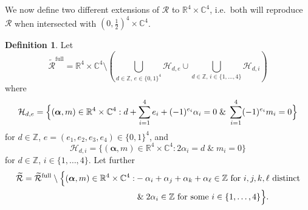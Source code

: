 \documentclass[12pt,letterpaper,reqno]{amsart}
\def\mathbf#1{#1}%
\theoremstyle{remark}
\theoremstyle{definition}
\newtheorem{defn}[thm]{Definition}
\numberwithin{thm}{section}
\numberwithin{equation}{section}
\numberwithin{figure}{section}
\newcommand{\R}{\ensuremath{\mathbb R}}
\newcommand{\C}{\ensuremath{\mathbb C}}
\newcommand{\Z}{\ensuremath{\mathbb Z}}
\begin{document}
\smallskip



 We now define two different extensions of $\mathcal{R}$  to $\R^4 \times \C^4$, i.e.\ both will reproduce $\mathcal{R}$ when intersected with $(0, \frac{1}{2})^4 \times \C^4$.

\begin{defn}\label{def:Rdomain}
Let
\[
\widetilde{\mathcal{R}}^{\mathrm{full}} = \R^4 \times \C^4 \setminus \left( 
\bigcup_{d \in \Z,\, \mathbf{e} \in \{0, 1\}^4} \mathcal{H}_{d, \mathbf{e}} \cup \bigcup_{d \in \Z, \, i \in   \{1, \ldots, 4\}} \mathcal{H}_{d,i}
\right)
\]
where
    \[
  \mathcal{H}_{d, \mathbf{e}} = \Bigl\{  (\boldsymbol{\alpha}, \mathbf{m}) \in \R^4 \times \C^4 :   d + \sum_{i=1}^4 e_i +  (-1)^{e_i} \alpha_i  =0  \;  \&  \;   \sum_{i=1}^4 (-1)^{e_i} m_i = 0 \Bigr\} \]
 for $d \in \Z$, $\mathbf{e} = (e_1, e_2, e_3, e_4) \in \{0, 1\}^4$, and
    \[
  \mathcal{H}_{d, i} = \bigl \{  (\boldsymbol{\alpha}, \mathbf{m}) \in \R^4 \times \C^4 :   2\alpha_i  =  d  \;  \&  \;    m_i = 0 \bigr \} \]
for $d \in \Z$, $i \in   \{1, \ldots, 4\} $. Let further
\begin{align*}
\widetilde{\mathcal{R}} =    \widetilde{\mathcal{R}}^{\mathrm{full}} \setminus  \Bigl\{(\boldsymbol{\alpha}, \mathbf{m}) \in \R^4 \times \C^4 : & -\alpha_i + \alpha_j + \alpha_k + \alpha_\ell \in \Z \mbox{ for } i,j,k,\ell \mbox{ distinct} \\ & \;  \&  \; 2\alpha_i \in \Z  \mbox{ for some } i \in   \{1, \ldots, 4\} \Bigr\}.
\end{align*}
\end{defn}
\end{document}

